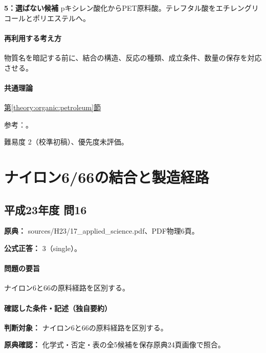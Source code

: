\noindent\textbf{5：選ばない候補} pキシレン酸化からPET原料酸。テレフタル酸をエチレングリコールとポリエステルへ。\par

\paragraph{再利用する考え方} 物質名を暗記する前に、結合の構造、反応の種類、成立条件、数量の保存を対応させる。

\paragraph{共通理論} \hyperref[theory:organic:petroleum]{第\ref*{theory:organic:petroleum}節}

\par 参考：\cite{organic_jpca_dict,organic_step}。

\par 難易度 2（校準初稿）、優先度未評価。

\section{ナイロン6/66の結合と製造経路}

\subsection{平成23年度 問16}
\label{q:h23-reg-applied-16}

\noindent\textbf{原典：} sources/H23/17\_applied\_science.pdf、PDF物理6頁。

\textbf{公式正答：} 3（single）。

\paragraph{問題の要旨} ナイロン6と66の原料経路を区別する。

\paragraph{確認した条件・記述（独自要約）}\mbox{}\par

\noindent\textbf{判断対象：} ナイロン6と66の原料経路を区別する。\par

\noindent\textbf{原典確認：} 化学式・否定・表の全5候補を保存原典24頁画像で照合。\par

